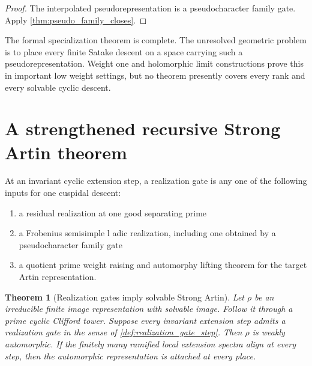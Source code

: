 \documentclass{aomart}
\newtheorem{theorem}{Theorem}[section]
\theoremstyle{definition}
\theoremstyle{remark}
\begin{document}
\begin{proof}
The interpolated pseudorepresentation is a pseudocharacter family gate. Apply \cref{thm:pseudo_family_closes}.
\end{proof}

\begin{remark}\label{rem:eigenvariety_boundary}
The formal specialization theorem is complete. The unresolved geometric problem is to place every finite Satake descent on a space carrying such a pseudorepresentation. Weight one and holomorphic limit constructions prove this in important low weight settings, but no theorem presently covers every rank and every solvable cyclic descent.
\end{remark}

\section{A strengthened recursive Strong Artin theorem}\label{sec:strengthened_recursion}

\begin{definition}\label{def:realization_gate_step}
At an invariant cyclic extension step, a realization gate is any one of the following inputs for one cuspidal descent:

\begin{enumerate}
\item a residual realization at one good separating prime
\item a Frobenius semisimple l adic realization, including one obtained by a pseudocharacter family gate
\item a quotient prime weight raising and automorphy lifting theorem for the target Artin representation.
\end{enumerate}
\end{definition}

\begin{theorem}[Realization gates imply solvable Strong Artin]\label{thm:gates_imply_solvable_artin}
Let \(\rho\) be an irreducible finite image representation with solvable image. Follow it through a prime cyclic Clifford tower. Suppose every invariant extension step admits a realization gate in the sense of \cref{def:realization_gate_step}. Then \(\rho\) is weakly automorphic. If the finitely many ramified local extension spectra align at every step, then the automorphic representation is attached at every place.
\end{theorem}
\end{document}

